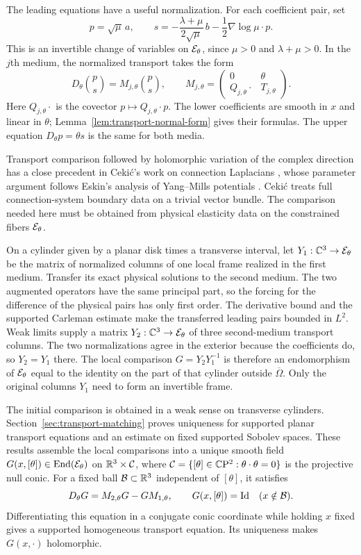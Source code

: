 The leading equations have a useful normalization. For each coefficient
pair, set
\[
 p=\sqrt\mu\,a,\qquad
 s=-\frac{\lambda+\mu}{2\sqrt\mu}\,b
       -\frac12\nabla\log\mu\cdot p.
\]
This is an invertible change of variables on $\mathcal E_\theta$, since
$\mu>0$ and $\lambda+\mu>0$. In the $j$th medium, the normalized
transport takes the form
\[
 D_\theta\binom{p}{s}
   =M_{j,\theta}\binom{p}{s},\qquad
 M_{j,\theta}=
 \begin{pmatrix}0&\theta\\Q_{j,\theta}\cdot&T_{j,\theta}\end{pmatrix}.
\]
Here $Q_{j,\theta}\cdot$ is the covector
$p\mapsto Q_{j,\theta}\cdot p$. The lower coefficients are smooth in $x$
and linear in $\theta$;
Lemma~\ref{lem:transport-normal-form} gives their formulas.
The upper equation $D_\theta p=\theta s$ is the same for both media.

Transport comparison followed by holomorphic variation of the complex
direction has a close precedent in Ceki\'c's work on connection Laplacians
\cite{Cekic2025}, whose parameter argument follows Eskin's analysis of
Yang--Mills potentials \cite{Eskin2001}. Ceki\'c treats full
connection-system boundary data on a trivial vector bundle. The comparison
needed here must be obtained from physical elasticity data on the
constrained fibers $\mathcal E_\theta$.

On a cylinder given by a planar disk times a transverse interval, let
$Y_1:\mathbb C^3\to\mathcal E_\theta$ be the matrix of normalized columns of one
local frame realized in the first medium. Transfer its exact physical
solutions to the second
medium. The two augmented operators have the same principal part, so the
forcing for the difference of the physical pairs has only first order.
The derivative bound and the supported Carleman estimate make the
transferred leading pairs bounded in $L^2$. Weak limits supply a matrix
$Y_2:\mathbb C^3\to\mathcal E_\theta$ of three second-medium transport columns.
The two normalizations agree in
the exterior because the coefficients do, so $Y_2=Y_1$ there.
The local comparison $G=Y_2Y_1^{-1}$ is therefore an endomorphism of
$\mathcal E_\theta$ equal to the identity on the part of that cylinder
outside $\overline\Omega$.
Only the original columns $Y_1$ need to form an invertible frame.

The initial comparison is obtained in a weak sense on transverse
cylinders. Section~\ref{sec:transport-matching} proves uniqueness for
supported planar transport equations and an estimate on fixed supported
Sobolev spaces. These results assemble the local comparisons into a
unique smooth field $G(x,[\theta])\in\operatorname{End}(\mathcal E_\theta)$
on $\mathbb R^3\times\mathcal C$, where
$\mathcal C=\{[\theta]\in\mathbb C\mathrm P^2:\theta\cdot\theta=0\}$ is the
projective null conic. For a fixed ball $\mathcal B\subset\mathbb R^3$
independent of $[\theta]$, it satisfies
\[
 D_\theta G=M_{2,\theta}G-GM_{1,\theta},
 \qquad G(x,[\theta])=\mathrm{Id}\quad(x\notin\mathcal B).
\]
Differentiating this equation in a conjugate conic coordinate while
holding $x$ fixed gives a supported homogeneous transport equation.
Its uniqueness makes $G(x,\cdot)$ holomorphic.

